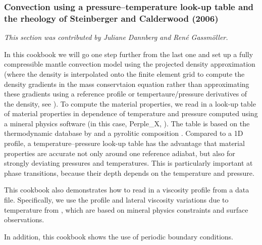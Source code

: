 \subsubsection{Convection using a pressure--temperature look-up table and the rheology of Steinberger and Calderwood (2006)}
\label{sec:cookbooks-steinberger}

\textit{This section was contributed by Juliane Dannberg and Ren{\'e} Gassm{\"o}ller.}

In this cookbook we will go one step further from the last one and set up a fully compressible mantle convection model using the projected density approximation (where the density is interpolated onto the finite element grid to compute the density gradients in the mass conservtaion equation rather than approximating these gradients using a reference profile or tempertaure/pressure derivatives of the density, see \cite{gassmoller2020formulations}). To compute the material properties, we read in a look-up table of material properties in dependence of temperature and pressure computed using a mineral physics software (in this case, Perple\_X, \cite{connolly2005computation}). The table is based on the thermodynamic database by \cite{stixrude2011thermodynamics} and a pyrolitic composition \cite{ringwood1988nature}. Compared to a 1D profile, a temperature--pressure look-up table has the advantage that material properties are accurate not only around one reference adiabat, but also for strongly deviating pressures and temperatures. This is particularly important at phase transitions, because their depth depends on the temperature and pressure. 

This cookbook also demonstrates how to read in a viscosity profile from a data file. Specifically, we use the profile and lateral viscosity variations due to temperature from \cite{stca06}, which are based on mineral physics constraints and surface observations. 

In addition, this cookbook shows the use of periodic boundary conditions. 

